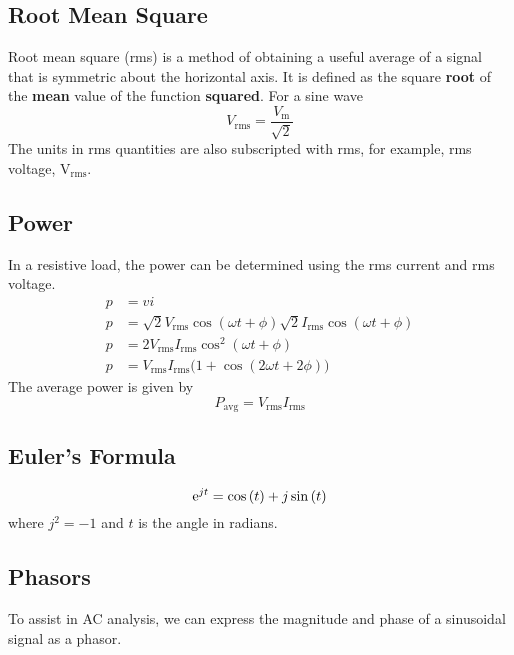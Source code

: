 \documentclass{article}
\begin{document}
\subsection{Root Mean Square}
\begin{definition}
    Root mean square (rms) is a method of obtaining a useful average of a signal that is symmetric about 
    the horizontal axis. It is defined as the square \textbf{root} of the \textbf{mean} value of the 
    function \textbf{squared}.
    For a sine wave  
    \begin{equation*}
        V_{\mathrm{rms}} = \frac{V_{\mathrm{m}}}{\sqrt{2}}
    \end{equation*}
    The units in rms quantities are also subscripted with rms, for example, rms voltage, $\si{\volt}_{\mathrm{rms}}$.
\end{definition}
\subsection{Power}
\begin{definition}
    In a resistive load, the power can be determined using the rms current and rms voltage.
    \begin{align*}
        p &= vi \\
        p &= \sqrt{2}V_{\mathrm{rms}}\cos{\left( \omega t + \phi \right)}\sqrt{2}I_{\mathrm{rms}}\cos{\left( \omega t + \phi \right)} \\
        p &= 2V_{\mathrm{rms}}I_{\mathrm{rms}}\cos^2{\left( \omega t + \phi \right)} \\
        p &= V_{\mathrm{rms}}I_{\mathrm{rms}}\bigl( 1 + \cos{\left( 2 \omega t + 2 \phi \right)} \bigr)
    \end{align*}
    The average power is given by
    \begin{equation*}
        P_{\mathrm{avg}} = V_{\mathrm{rms}}I_{\mathrm{rms}}
    \end{equation*}
\end{definition}
\subsection{Euler's Formula}
\begin{theorem}
    \begin{equation*}
        \mathrm{e}^{jt} = \cos{\left( t \right)} + j \sin{\left( t \right)}
    \end{equation*}
    where $j^2=-1$ and $t$ is the angle in radians.
\end{theorem}
\subsection{Phasors}
\begin{definition}
    To assist in AC analysis, we can express the magnitude and phase of a sinusoidal signal
    as a phasor. 
\end{definition}
\end{document}
